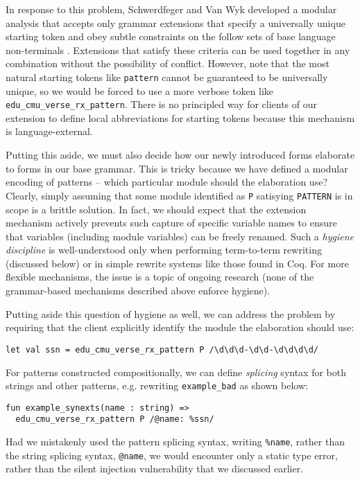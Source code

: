 In response to this problem, Schwerdfeger and Van Wyk developed a modular analysis that accepts only grammar extensions that specify a universally unique starting token and obey subtle constraints on  the follow sets of base language non-terminals \cite{conf/pldi/SchwerdfegerW09}. Extensions that satisfy these criteria can be used together in any combination without the possibility of conflict. However, note that the most natural starting tokens like \lstinline{pattern} cannot be guaranteed to be universally unique, so we would be forced to use a more verbose token like \lstinline{edu_cmu_verse_rx_pattern}. There is no principled way for clients of our extension to define local abbreviations for starting tokens because this mechanism is language-external.

Putting this aside, we must also decide how our newly introduced forms elaborate to forms in our base grammar. This is tricky because we have defined a modular encoding of patterns -- which particular module should the elaboration use? Clearly, simply assuming that some module identified as \lstinline{P} satisying \lstinline{PATTERN} is in scope is a brittle solution. In fact, we should expect that the extension mechanism actively prevents such capture of specific variable names to ensure that variables (including module variables) can be freely renamed. Such a \emph{hygiene discipline} is well-understood only when performing term-to-term rewriting (discussed below) or in simple rewrite systems like those found in Coq. For more flexible mechanisms, the issue is a topic of ongoing research (none of the grammar-based mechanisms described above enforce hygiene).

Putting aside this question of hygiene as well, we can address the problem by requiring that the client explicitly identify the module the elaboration should use:
\begin{lstlisting}[numbers=none]
let val ssn = edu_cmu_verse_rx_pattern P /\d\d\d-\d\d-\d\d\d\d/
\end{lstlisting}
For patterns constructed compositionally, we can define \emph{splicing} syntax for both strings and other patterns, e.g. rewriting \lstinline{example_bad} as shown below:
\begin{lstlisting}[numbers=none,escapechar=|]
fun example_synexts(name : string) => 
  edu_cmu_verse_rx_pattern P /@name: %ssn/
\end{lstlisting}
Had we mistakenly used the pattern splicing syntax, writing \lstinline{%name}, rather than the string splicing syntax, \lstinline{@name}, we would encounter only a static type error, rather than the  silent injection  vulnerability that we discussed earlier.

